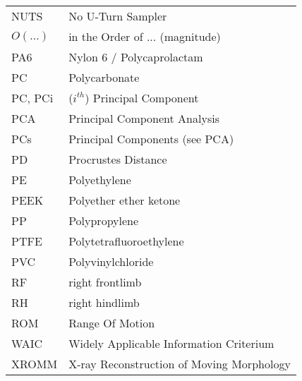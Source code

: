 \begin{small}
\begin{longtable}{l @{ -- } l}
\\ NUTS & No U-Turn Sampler
\\ \(O\left(\ldots\right)\) & in the Order of ... (magnitude)
\\ PA6 & Nylon 6 / Polycaprolactam
\\ PC & Polycarbonate
\\ PC, PCi & (\(i^{th}\)) Principal Component
\\ PCA & Principal Component Analysis
\\ PCs & Principal Components (see PCA)
\\ PD & Procrustes Distance
\\ PE & Polyethylene
\\ PEEK & Polyether ether ketone
\\ PP & Polypropylene
\\ PTFE & Polytetrafluoroethylene
\\ PVC & Polyvinylchloride
\\ RF & right frontlimb
\\ RH & right hindlimb
\\ ROM & Range Of Motion
\\ WAIC & Widely Applicable Information Criterium
\\ XROMM & X-ray Reconstruction of Moving Morphology
\end{longtable}
\end{small}

